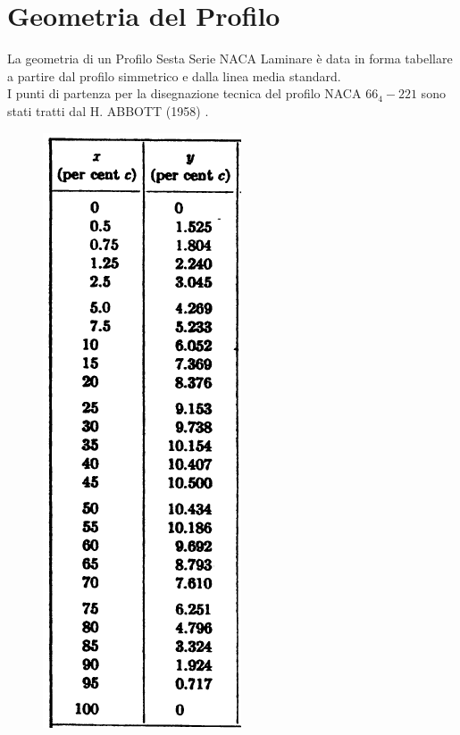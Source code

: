 \chapter{Geometria del Profilo}

La geometria di un Profilo Sesta Serie NACA Laminare è data in forma tabellare a partire dal profilo simmetrico e dalla linea media standard.\\ I punti di partenza per la disegnazione tecnica del profilo NACA $66_4-221$ sono stati tratti dal  H. ABBOTT (1958) \cite{prof:abbott}.\\ 

\begin{figure}[H]
\centering
\begin {minipage} [c] {.40\textwidth}
\centering\setlength{\captionmargin}{0pt}%
\includegraphics[width=.63\textwidth]{immagini/simmetrico.png}      %

\end{minipage}
\end{figure}
